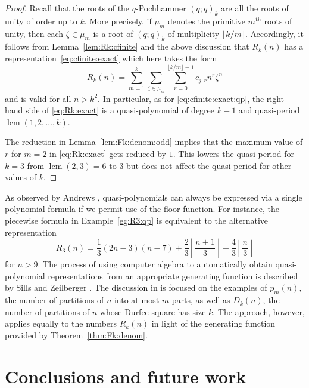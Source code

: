 \documentclass[11pt]{article}
\theoremstyle{plain}
\theoremstyle{definition}
\begin{document}
\begin{proof}
  Recall that the roots of the $q$-Pochhammer $(q ; q)_k$ are all the roots of
  unity of order up to $k$. More precisely, if $\mu_m$ denotes the primitive
  $m^{\text{th}}$ roots of unity, then each $\zeta \in \mu_m$ is a root of $(q
  ; q)_k$ of multiplicity $\lfloor k / m \rfloor$. Accordingly, it follows
  from Lemma~\ref{lem:Rk:cfinite} and the above discussion that $R_k (n)$ has
  a representation~\eqref{eq:cfinite:exact} which here takes the form
  \begin{equation}
    R_k (n) = \sum_{m = 1}^k \sum_{\zeta \in \mu_m} \sum_{r = 0}^{\lfloor k /
    m \rfloor - 1} c_{j, r} n^r \zeta^n \label{eq:Rk:exact}
  \end{equation}
  and is valid for all $n > k^2$. In particular, as for
  \eqref{eq:cfinite:exact:qp}, the right-hand side of \eqref{eq:Rk:exact} is a
  quasi-polynomial of degree $k - 1$ and quasi-period $\operatorname{lcm} (1, 2,
  \ldots, k)$.
  
  The reduction in Lemma~\ref{lem:Fk:denom:odd} implies that the maximum value
  of $r$ for $m = 2$ in \eqref{eq:Rk:exact} gets reduced by $1$. This lowers
  the quasi-period for $k = 3$ from $\operatorname{lcm} (2, 3) = 6$ to $3$ but does
  not affect the quasi-period for other values of $k$.
\end{proof}

As observed by Andrews \cite{andrews-pn-q-mod}, quasi-polynomials can always
be expressed via a single polynomial formula if we permit use of the floor
function. For instance, the piecewise formula in Example~\ref{eg:R3:qp} is
equivalent to the alternative representation
\begin{equation*}
  R_3 (n) = \frac{1}{3} (2 n - 3) (n - 7) + \frac{2}{3} \left\lfloor \frac{n
   + 1}{3} \right\rfloor + \frac{4}{3} \left\lfloor \frac{n}{3} \right\rfloor
\end{equation*}
for $n > 9$. The process of using computer algebra to automatically obtain
quasi-polynomial representations from an appropriate generating function is
described by Sills and Zeilberger \cite{sz-pmn-quasi}. The discussion in
\cite{sz-pmn-quasi} is focused on the examples of $p_m (n)$, the number of
partitions of $n$ into at most $m$ parts, as well as $D_k (n)$, the number of
partitions of $n$ whose Durfee square has size $k$. The approach, however,
applies equally to the numbers $R_k (n)$ in light of the generating function
provided by Theorem~\ref{thm:Fk:denom}.

\section{Conclusions and future work}
\end{document}
